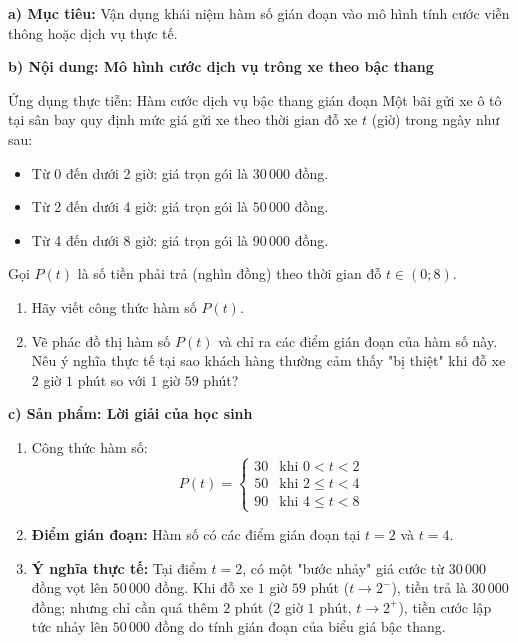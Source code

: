 \documentclass[12pt, a4paper]{article}
\begin{document}
\noindent \textbf{a) Mục tiêu:}
Vận dụng khái niệm hàm số gián đoạn vào mô hình tính cước viễn thông hoặc dịch vụ thực tế.

\noindent \textbf{b) Nội dung: Mô hình cước dịch vụ trông xe theo bậc thang}
\begin{pedabox}{Ứng dụng thực tiễn: Hàm cước dịch vụ bậc thang gián đoạn}
Một bãi gửi xe ô tô tại sân bay quy định mức giá gửi xe theo thời gian đỗ xe $t$ (giờ) trong ngày như sau:
\begin{itemize}[leftmargin=0.6cm]
    \item Từ 0 đến dưới 2 giờ: giá trọn gói là $30\,000$ đồng.
    \item Từ 2 đến dưới 4 giờ: giá trọn gói là $50\,000$ đồng.
    \item Từ 4 đến dưới 8 giờ: giá trọn gói là $90\,000$ đồng.
\end{itemize}
Gọi $P(t)$ là số tiền phải trả (nghìn đồng) theo thời gian đỗ $t \in (0; 8)$.
\begin{enumerate}[leftmargin=0.6cm]
    \item Hãy viết công thức hàm số $P(t)$.
    \item Vẽ phác đồ thị hàm số $P(t)$ và chỉ ra các điểm gián đoạn của hàm số này. Nêu ý nghĩa thực tế tại sao khách hàng thường cảm thấy "bị thiệt" khi đỗ xe $2$ giờ $1$ phút so với $1$ giờ $59$ phút?
\end{enumerate}
\end{pedabox}

\noindent \textbf{c) Sản phẩm: Lời giải của học sinh}
\begin{enumerate}[leftmargin=0.6cm]
    \item Công thức hàm số:
    $$P(t) = \begin{cases} 30 & \text{khi } 0 < t < 2 \\ 50 & \text{khi } 2 \le t < 4 \\ 90 & \text{khi } 4 \le t < 8 \end{cases}$$
    \item \textbf{Điểm gián đoạn:} Hàm số có các điểm gián đoạn tại $t = 2$ và $t = 4$.
    \item \textbf{Ý nghĩa thực tế:} Tại điểm $t = 2$, có một "bước nhảy" giá cước từ $30\,000$ đồng vọt lên $50\,000$ đồng. Khi đỗ xe $1$ giờ $59$ phút ($t \to 2^-$), tiền trả là $30\,000$ đồng; nhưng chỉ cần quá thêm $2$ phút ($2$ giờ $1$ phút, $t \to 2^+$), tiền cước lập tức nhảy lên $50\,000$ đồng do tính gián đoạn của biểu giá bậc thang.
\end{enumerate}
\end{document}
